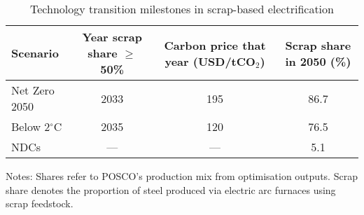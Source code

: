\begin{table}[ht]
  \centering
  \caption{Technology transition milestones in scrap-based electrification}
  \label{tab:technology-thresholds}
  \begin{threeparttable}
  \begin{tabular}{@{}lccc@{}}
    \toprule
    Scenario & Year scrap share $\ge$50\% & Carbon price that year (USD/tCO$_2$) & Scrap share in 2050 (\%) \\
    \midrule
    Net Zero 2050 & 2033 & 195 & 86.7 \\
    Below 2$^\circ$C & 2035 & 120 & 76.5 \\
    NDCs & --- & --- & 5.1 \\
    \bottomrule
  \end{tabular}
  \begin{tablenotes}
    \footnotesize
    \item Notes: Shares refer to POSCO's production mix from optimisation outputs. Scrap share denotes the proportion of steel produced via electric arc furnaces using scrap feedstock.
  \end{tablenotes}
  \end{threeparttable}
\end{table}

